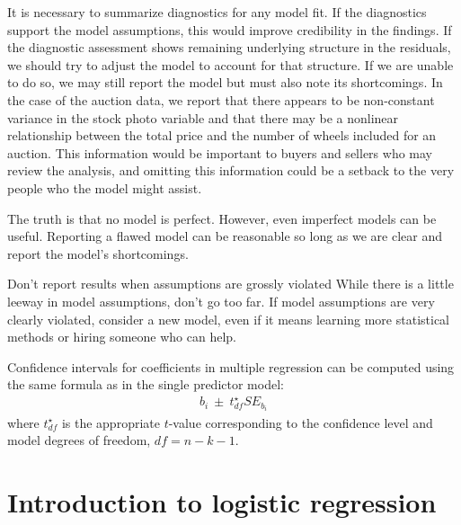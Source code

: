 \begin{description}
\end{description}

It is necessary to summarize diagnostics for any model fit. If the diagnostics support the model assumptions, this would improve credibility in the findings. If the diagnostic assessment shows remaining underlying structure in the residuals, we should try to adjust the model to account for that structure. If we are unable to do so, we may still report the model but must also note its shortcomings. In the case of the auction data, we report that there appears to be non-constant variance in the stock photo variable and that there may be a nonlinear relationship between the total price and the number of wheels included for an auction. This information would be important to buyers and sellers who may review the analysis, and omitting this information could be a setback to the very people who the model might assist.

\begin{tipBox}{
The truth is that no model is perfect. However, even imperfect models can be useful. Reporting a flawed model can be reasonable so long as we are clear and report the model's shortcomings.}
\end{tipBox}

\begin{caution}
{Don't report results when assumptions are grossly violated}
{While there is a little leeway in model assumptions, don't go too far. If model assumptions are very clearly violated, consider a new model, even if it means learning more statistical methods or hiring someone who can help.}
\end{caution}

\begin{tipBox}{
Confidence intervals for coefficients in multiple regression can be computed using the same formula as in the single predictor model:
\begin{align*}
b_i \ \pm\ t_{df}^{\star}SE_{b_{i}}
\end{align*}
where $t_{df}^{\star}$ is the appropriate $t$-value corresponding to the confidence level and model degrees of freedom, $df=n-k-1$.}
\end{tipBox}


\section[Introduction to logistic regression]{Introduction to logistic regression ~}
\label{logisticRegression}

